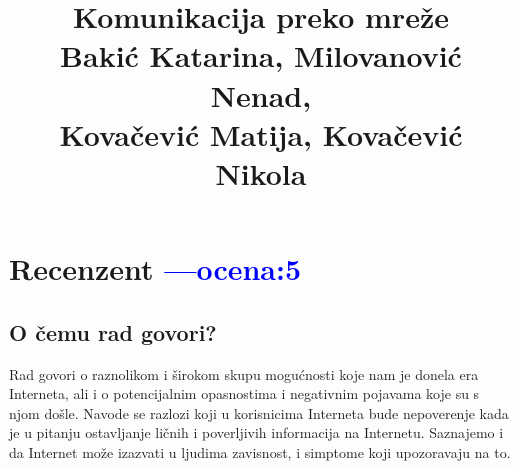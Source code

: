 \documentclass[a4paper]{report}
\newcommand{\odgovor}[1]{\textcolor{blue}{#1}}
\begin{document}
\title{Komunikacija preko mreže\\ \small{Bakić Katarina, Milovanović Nenad, \\Kovačević Matija, Kovačević Nikola}}

\maketitle

\tableofcontents

\chapter{Recenzent \odgovor{---ocena:5}}


\section{O čemu rad govori?}
Rad govori o raznolikom i širokom skupu mogućnosti koje nam je donela era Interneta, ali i o potencijalnim opasnostima i negativnim pojavama koje su s njom došle. Navode se razlozi koji u korisnicima Interneta bude nepoverenje kada je u pitanju ostavljanje ličnih i poverljivih informacija na Internetu. Saznajemo i da Internet može izazvati u ljudima zavisnost, i simptome koji upozoravaju na to.
\end{document}
